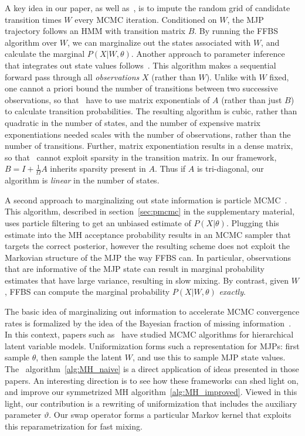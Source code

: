 A key idea in our paper, as well as~\cite{RaoTeh13}, is to impute the random grid of candidate transition times $W$ every MCMC iteration. 
Conditioned on $W$, the MJP trajectory follows an HMM with transition matrix $B$. 
By running the FFBS algorithm over $W$, we can marginalize out the states associated with $W$, and calculate the marginal $P(X|W,\theta)$. 
Another approach to parameter inference that integrates out state values follows~\citet{FearnSher2006}. 
 This algorithm makes a sequential forward pass through all {\em observations} $X$ (rather than $W$). 
 Unlike with $W$ fixed, one cannot a priori bound the number of transitions between two successive observations, so that~\citet{FearnSher2006} have to use matrix exponentials of $A$ (rather than just $B$) to calculate transition probabilities.
 The resulting algorithm is cubic, rather than quadratic in the number of states, and the number of expensive matrix exponentiations needed scales with the number of observations, rather than the number of transitions.
 Further, matrix exponentiation results in a dense matrix, so that~\cite{FearnSher2006} cannot exploit sparsity in the transition matrix.
 In our framework, $B=I+\frac{1}{\Omega}A$ inherits sparsity present in $A$. Thus if $A$ is tri-diagonal, our algorithm is {\em linear} in the number of states.

 A second approach to marginalizing out state information is particle MCMC~\citep{Andrieu10}. 
 This algorithm, described in section~\ref{sec:pmcmc} in the supplementary material, uses particle filtering to get an unbiased estimate of $P(X|\theta)$. 
 Plugging this estimate into the MH acceptance probability results in an MCMC sampler that targets the correct posterior, however the resulting scheme does not exploit the Markovian structure of the MJP the way FFBS can. 
 In particular, observations that are informative of the MJP state can result in marginal probability estimates that have large variance, resulting in slow mixing. 
 By contrast, given $W$, FFBS can compute the marginal probability $P(X|W,\theta)$ {\em exactly}. 

The basic idea of marginalizing out information to accelerate MCMC convergence rates is formalized by the idea of the Bayesian fraction of missing information~\citep{liu1994fraction}. 
In this context, papers such as~\citet{papaspiliopoulos2007general,yu2011center} have studied MCMC algorithms for hierarchical latent variable models. 
Uniformization forms such a representation for MJPs: first sample $\theta$, then sample the latent $W$, and use this to sample MJP state values. 
The \naive\ algorithm~\ref{alg:MH_naive} is a direct application of ideas presented in those papers.
An interesting direction is to see how these frameworks can shed light on, and improve our symmetrized MH algorithm~\ref{alg:MH_improved}. 
Viewed in this light, our contribution is a rewriting of uniformization that includes the auxiliary parameter $\vartheta$. Our swap operator forms a particular Markov kernel that exploits this reparametrization for fast mixing. 

